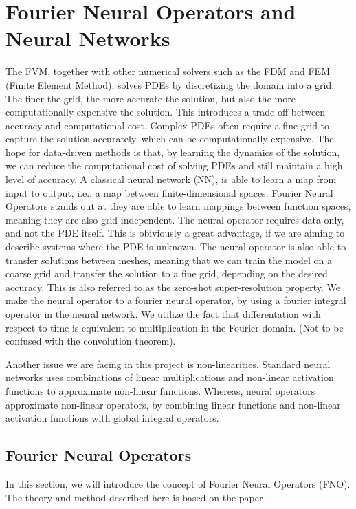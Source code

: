 \section{Fourier Neural Operators and Neural Networks}
The FVM, together with other numerical solvers such as the FDM and FEM (Finite Element Method), solves PDEs by discretizing the domain into a grid.
The finer the grid, the more accurate the solution, but also the more computationally expensive the solution. This introduces a trade-off between accuracy and computational cost.
Complex PDEs often require a fine grid to capture the solution accurately, which can be computationally expensive.
The hope for data-driven methods is that, by learning the dynamics of the solution, we can reduce the computational cost of solving PDEs and still maintain a high level of accuracy.
A classical neural network (NN), is able to learn a map from input to output, i.e., a map between finite-dimensional spaces.
Fourier Neural Operators stands out at they are able to learn mappings between function spaces, meaning they are also grid-independent.
The neural operator requires data only, and not the PDE itself.
This is obiviously a great advantage, if we are aiming to describe systems where the PDE is unknown. 
The neural operator is also able to transfer solutions between meshes, meaning that we can train the model on a coarse grid and transfer the solution to a fine grid, depending on the desired accuracy.
This is also referred to as the zero-shot super-resolution property.
We make the neural operator to a fourier neural operator, by using a fourier integral operator in the neural network.
We utilize the fact that differentation with respect to time is equivalent to multiplication in the Fourier domain.
(Not to be confused with the convolution theorem).

Another issue we are facing in this project is non-linearities.
Standard neural networks uses combinations of linear multiplications and non-linear activation functions to approximate non-linear functions.
Whereas, neural operators approximate non-linear operators, by combining linear functions and non-linear activation functions with global integral operators. 


\subsection{Fourier Neural Operators}
In this section, we will introduce the concept of Fourier Neural Operators (FNO).
The theory and method described here is based on the paper~\cite{FNO_2021}.

